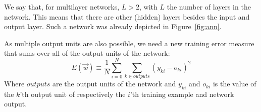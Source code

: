 We say that, for multilayer networks, $L>2$, with $L$ the number of layers in the network. This means that there are other (hidden) layers besides the input and output layer. Such a network was already depicted in Figure~\ref{fig:ann}.

As multiple output units are also possible, we need a new training error measure that sums over all of the output units of the network:
\begin{equation}
    E(\overrightarrow{w}) \equiv \frac{1}{N} \sum_{i=0}^N \sum_{k \in outputs} (y_{ki} - o_{ki})^2
\end{equation}
Where $outputs$ are the output units of the network and $y_{ki}$ and $o_{ki}$ is the value of the $k$'th output unit of respectively the $i$'th training example and network output.\\

